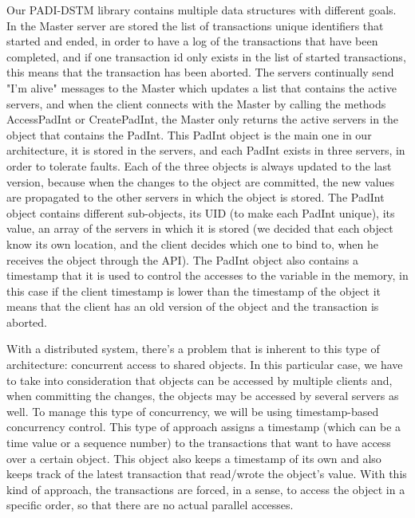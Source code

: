 \documentclass[times, 10pt,twocolumn]{article}
\begin{document}

Our PADI-DSTM library contains multiple data structures with different goals. In the Master server are stored the list of transactions unique identifiers that started and ended, in order to have a log of the transactions that have been completed, and if one transaction id only exists in the list of started transactions, this means that the transaction has been aborted. The servers continually send "I'm alive" messages to the Master which updates a list that contains the active servers, and when the client connects with the Master by calling the methods AccessPadInt or CreatePadInt, the Master only returns the active servers in the object that contains the PadInt. This PadInt object is the main one in our architecture, it is stored in the servers, and each PadInt exists in three servers, in order to tolerate faults. Each of the three objects is always updated to the last version, because when the changes to the object are committed, the new values are propagated to the other servers in which the object is stored. The PadInt object contains different sub-objects, its UID (to make each PadInt unique), its value, an array of the servers in which it is stored (we decided that each object know its own location, and the client decides which one to bind to, when he receives the object through the API). The PadInt object also contains a timestamp that it is used to control the accesses to the variable in the memory, in this case if the client timestamp is lower than the timestamp of the object it means that the client has an old version of the object and the transaction is aborted.



With a distributed system, there's a problem that is inherent to this type of architecture: concurrent access to shared objects. In this particular case, we have to take into consideration that objects can be accessed by multiple clients and, when committing the changes, the objects may be accessed by several servers as well.
To manage this type of concurrency, we will be using timestamp-based concurrency control. This type of approach assigns a timestamp (which can be a time value or a sequence number) to the transactions that want to have access over a certain object. This object also keeps a timestamp of its own and also keeps track of the latest transaction that read/wrote the object's value. With this kind of approach, the transactions are forced, in a sense, to access the object in a specific order, so that there are no actual parallel accesses.
\end{document}
